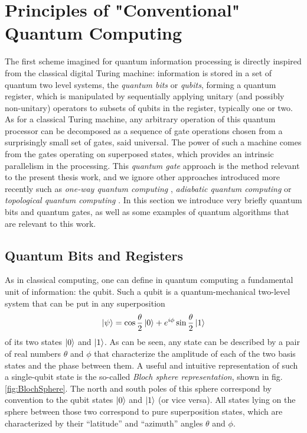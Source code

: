 \section{Principles of "Conventional" Quantum Computing}

The first scheme imagined for quantum information processing is directly inspired from the classical digital Turing machine: information is stored in a set of quantum two level systems, the {\it quantum bits} or {\it qubits}, forming a quantum register, which is manipulated by sequentially applying unitary (and possibly non-unitary) operators to subsets of qubits in the register, typically one or two. As for a classical Turing machine, any arbitrary operation of this quantum processor can be decomposed as a sequence of gate operations chosen from a surprisingly small set of gates, said universal. The power of such a machine comes from the gates operating on superposed states, which provides an intrinsic parallelism in the processing.
\smallskip
This {\it quantum gate} approach is the method relevant to the present thesis work, and we ignore other approaches introduced more recently such as {\it one-way quantum computing} \citep{raussendorf_one-way_2001}, {\it adiabatic quantum computing} \citep{farhi_quantum_2000} or {\it topological quantum computing} \citep{kitaev_fault-tolerant_2003}. In this section we introduce very briefly quantum bits and quantum gates, as well as some examples of quantum algorithms that are relevant to this work.


\subsection{Quantum Bits and Registers}

As in classical computing, one can define in quantum computing a fundamental unit of information: the qubit. Such a qubit is a quantum-mechanical two-level system that can be put in any superposition
%
\begin{equation}
\left| \psi \right> = \cos{\frac{\theta}{2}}\left| 0 \right>+e^{i\phi}\sin{\frac{\theta}{2}}\left| 1 \right>
\end{equation}
%
of its two states $\left| 0 \right>$ and $\left| 1 \right>$.
As can be seen, any state can be described by a pair of real numbers $\theta$ and $\phi$ that characterize the amplitude of each of the two basis states and the phase between them. A useful and intuitive representation of such a single-qubit state is the so-called {\it Bloch sphere representation}, shown in fig. \ref{fig:BlochSphere}. The north and south poles of this sphere correspond by convention to the qubit states $\left| 0 \right>$ and $\left| 1 \right>$ (or vice versa). All states lying on the sphere between those two correspond to pure superposition states, which are characterized by their ``latitude'' and ``azimuth'' angles $\theta$ and $\phi$. 

